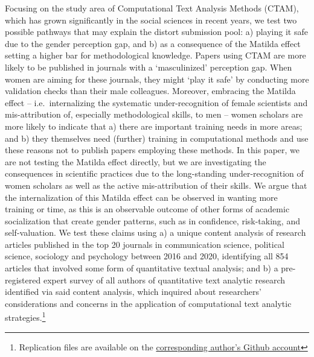 \documentclass[
]{ccr}
\begin{document}
Focusing on the study area of Computational Text Analysis Methods
(CTAM), which has grown significantly in the social sciences in recent
years, we test two possible pathways that may explain the distort
submission pool: a) playing it safe due to the gender perception gap,
and b) as a consequence of the Matilda effect setting a higher bar for
methodological knowledge. Papers using CTAM are more likely to be
published in journals with a `masculinized' perception gap. When women
are aiming for these journals, they might `play it safe' by conducting
more validation checks than their male colleagues. Moreover, embracing
the Matilda effect -- i.e.~internalizing the systematic
under-recognition of female scientists and mis-attribution of,
especially methodological skills, to men -- women scholars are more
likely to indicate that a) there are important training needs in more
areas; and b) they themselves need (further) training in computational
methods and use these reasons not to publish papers employing these
methods. In this paper, we are not testing the Matilda effect directly,
but we are investigating the consequences in scientific practices due to
the long-standing under-recognition of women scholars as well as the
active mis-attribution of their skills. We argue that the
internalization of this Matilda effect can be observed in wanting more
training or time, as this is an observable outcome of other forms of
academic socialization that create gender patterns, such as in
confidence, risk-taking, and self-valuation. We test these claims using
a) a unique content analysis of research articles published in the top
20 journals in communication science, political science, sociology and
psychology between 2016 and 2020, identifying all 854 articles that
involved some form of quantitative textual analysis; and b) a
pre-registered expert survey of all authors of quantitative text
analytic research identified via said content analysis, which inquired
about researchers' considerations and concerns in the application of
computational text analytic strategies.\footnote{Replication files are
  available on the
  \href{https://github.com/MarikenvdVelden/gender-ctam}{corresponding
  author's Github account}}
\end{document}
